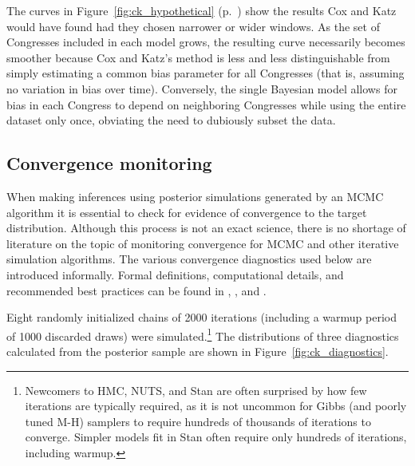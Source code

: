 The curves in Figure~\ref{fig:ck_hypothetical} (p.~\pageref{fig:ck_hypothetical}) show the results Cox and Katz would have found had they chosen narrower or wider windows. As the set of Congresses included in each model grows, the resulting curve necessarily becomes smoother because Cox and Katz's method is less and less distinguishable from simply estimating a common bias parameter for all Congresses (that is, assuming no variation in bias over time). Conversely, the single Bayesian model allows for bias in each Congress to depend on neighboring Congresses while using the entire dataset only once, obviating the need to dubiously subset the data. 

\subsection{Convergence monitoring}
\label{subsection_convergence}

When making inferences using posterior simulations generated by an MCMC algorithm it is essential to check for evidence of convergence to the target distribution. Although this process is not an exact science, there is no shortage of literature on the topic of monitoring convergence for MCMC and other iterative simulation algorithms. The various convergence diagnostics used below are introduced informally. Formal definitions, computational details, and recommended best practices can be found in , , and .

Eight randomly initialized chains of 2000 iterations (including a warmup period of 1000 discarded draws) were simulated.\footnote{Newcomers to HMC, NUTS, and Stan are often surprised by how few iterations are typically required, as it is not uncommon for Gibbs (and poorly tuned M-H) samplers to require hundreds of thousands of iterations to converge. Simpler models fit in Stan often require only hundreds of iterations, including warmup.} The distributions of three diagnostics calculated from the posterior sample are shown in Figure~\ref{fig:ck_diagnostics}. 

